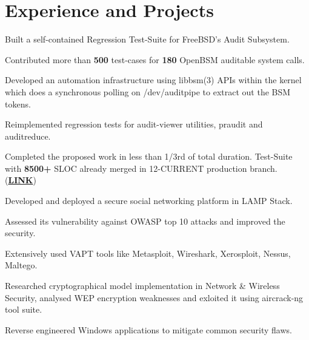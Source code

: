 \documentclass[]{deedy-resume-openfont}
\begin{document}
\begin{minipage}[t]{0.70\textwidth} 

\vspace{-0.7cm}
\section{Experience and Projects}
\vspace{\topsep} %
\begin{tightemize}
  \item Built a self-contained Regression Test-Suite for FreeBSD's Audit Subsystem. 
  \item Contributed more than \textbf{500} test-cases for \textbf{180} OpenBSM auditable system calls.
  \item Developed an automation infrastructure using libbsm(3) APIs within the kernel which does a synchronous polling on /dev/auditpipe to extract out the BSM tokens.
  \item Reimplemented regression tests for audit-viewer utilities, praudit and auditreduce.
  \item	Completed the proposed work in less than 1/3rd of total duration. Test-Suite with \textbf{8500+} SLOC already merged in 12-CURRENT production branch. (\href{https://github.com/freebsd/freebsd/tree/master/tests/sys/audit}{\textbf{LINK}})
\end{tightemize}

\vspace{0.1cm}
\vspace{0cm} %
\begin{tightemize}
  \item Developed and deployed a secure social networking platform in LAMP Stack. 
  \item Assessed its vulnerability against OWASP top 10 attacks and improved the security.
  \item Extensively used VAPT tools like Metasploit, Wireshark, Xerosploit, Nessus, Maltego.
  \item	Researched cryptographical model implementation in Network \& Wireless Security, analysed WEP encryption weaknesses and exloited it using aircrack-ng tool suite.
  \item Reverse engineered Windows applications to mitigate common security flaws.
\end{tightemize}


\end{minipage}
\end{document}
